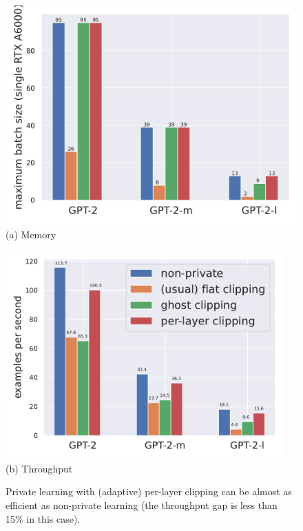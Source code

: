 \begin{figure}[htb]
\begin{center}
\begin{minipage}[t]{0.45\linewidth}
\centering
{\includegraphics[width=0.95\linewidth]{files/fig/profile_v2/memory_100_default_fast_float.pdf}} \\
(a) Memory
\end{minipage}
\begin{minipage}[t]{0.45\linewidth}
\centering
{\includegraphics[width=0.95\textwidth]{files/fig/profile_v2/throughput_100_default_fast_float.pdf}} \\
(b) Throughput
\end{minipage}
\end{center}
\caption{
Private learning with (adaptive) per-layer clipping can be almost as efficient as non-private learning (the throughput gap is less than 15\% in this case).
}
\label{fig:gpt2runtime-breakdown}
\end{figure}

